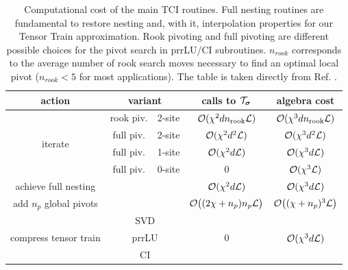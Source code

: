 \begin{table}[ht!]
	\centering
	\small                       %
	\setlength{\tabcolsep}{4pt}  %
  
\begin{adjustbox}{max width=\textwidth} 
	\begin{tabular}{|c|c|c|c|c|}
	\hline 
	action & \multicolumn{2}{c|}{variant} & calls to $\mathcal{T}_{\boldsymbol{\sigma}}$ & algebra cost\tabularnewline
	\hline 
	\hline 
	\multirow{4}{*}{iterate} & rook piv. & 2-site & $\mathcal{O}(\chi^{2}dn_{\text{rook}}\mathcal{L})$ & $\mathcal{O}(\chi^{3}dn_{\text{rook}}\mathcal{L})$\tabularnewline
	\cline{2-5} \cline{3-5} \cline{4-5} \cline{5-5} 
	 & full piv. & 2-site & $\mathcal{O}(\chi^{2}d^{2}\mathcal{L})$ & $\mathcal{O}(\chi^{3}d^{2}\mathcal{L})$\tabularnewline
	\cline{2-5} \cline{3-5} \cline{4-5} \cline{5-5} 
	 & full piv. & 1-site & $\mathcal{O}(\chi^{2}d\mathcal{L})$ & $\mathcal{O}(\chi^{3}d\mathcal{L})$\tabularnewline
	\cline{2-5} \cline{3-5} \cline{4-5} \cline{5-5} 
	 & full piv. & 0-site & 0 & $\mathcal{O}(\chi^{3}\mathcal{L})$\tabularnewline
	\hline 
	achieve full nesting & \multicolumn{2}{c|}{} & $\mathcal{O}(\chi^{2}d\mathcal{L})$ & $\mathcal{O}(\chi^{3}d\mathcal{L})$ \tabularnewline
	\hline 
	add $n_{p}$ global pivots & \multicolumn{2}{c|}{} & $\mathcal{O}\bigl((2\chi+n_{p})n_{p}\mathcal{L}\bigr)$ & $\mathcal{O}\bigl((\chi+n_{p})^{3}\mathcal{L}\bigr)$\tabularnewline
	\hline 
	\multirow{3}{*}{compress tensor train} & \multicolumn{2}{c|}{SVD} & \multirow{3}{*}{0} & \multirow{3}{*}{$\mathcal{O}(\chi^{3}d\mathcal{L})$}\tabularnewline
	\cline{2-3} \cline{3-3} 
	 & \multicolumn{2}{c|}{prrLU} &  & \tabularnewline
	\cline{2-3} \cline{3-3} 
	 & \multicolumn{2}{c|}{CI} &  & \tabularnewline
	\hline 
	\end{tabular}
\end{adjustbox}

\caption{Computational cost of the main TCI routines. Full nesting routines are fundamental to restore nesting and, with it, interpolation properties for our Tensor Train approximation. Rook pivoting and full pivoting are different possible choices for the pivot search in prrLU/CI subroutines. $n_{rook}$ corresponds to the average number of rook search moves necessary to find an optimal local pivot ($n_{rook} < 5$ for most applications). The table is taken directly from Ref. \cite{Fernandez2024}.}
\label{tab:cost}
\end{table}	

